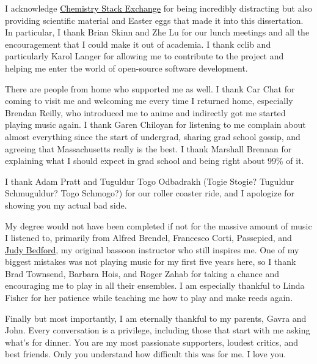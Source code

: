 \documentclass[%
  class = article,%
  crop = false,%
  float = true,%
  multi = true,%
  preview = false,%
]{standalone}
\begin{document}
I acknowledge \href{https://chemistry.stackexchange.com/users/194/}{\textcolor{black}{Chemistry Stack Exchange}} for being incredibly distracting but also providing scientific material and Easter eggs that made it into this dissertation. In particular, I thank Brian Skinn and Zhe Lu for our lunch meetings and all the encouragement that I could make it out of academia. I thank cclib and particularly Karol Langer for allowing me to contribute to the project and helping me enter the world of open-source software development.

There are people from home who supported me as well. I thank Car Chat for coming to visit me and welcoming me every time I returned home, especially Brendan Reilly, who introduced me to anime and indirectly got me started playing music again. I thank Garen Chiloyan for listening to me complain about almost everything since the start of undergrad, sharing grad school gossip, and agreeing that Massachusetts really is the best. I thank Marshall Brennan for explaining what I should expect in grad school and being right about 99\% of it.

I thank Adam Pratt and Tuguldur Togo Odbadrakh (Togie Stogie? Tuguldur Schmuguldur? Togo Schmogo?) for our roller coaster ride, and I apologize for showing you my actual bad side.

My degree would not have been completed if not for the massive amount of music I listened to, primarily from Alfred Brendel, Francesco Corti, Passepied, and \href{https://www.urbandictionary.com/define.php?term=%22Life%27s%20a%20Bitch%20and%20Then%20You%20Die%22}{\textcolor{black}{Judy Bedford}}, my original bassoon instructor who still inspires me. One of my biggest mistakes was not playing music for my first five years here, so I thank Brad Townsend, Barbara Hois, and Roger Zahab for taking a chance and encouraging me to play in all their ensembles. I am especially thankful to Linda Fisher for her patience while teaching me how to play and make reeds again.

Finally but most importantly, I am eternally thankful to my parents, Gavra and John. Every conversation is a privilege, including those that start with me asking what's for dinner. You are my most passionate supporters, loudest critics, and best friends. Only you understand how difficult this was for me. I love you.
\end{document}
